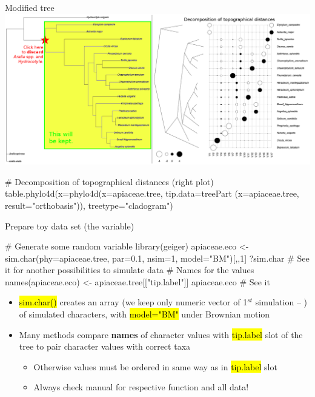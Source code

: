 \documentclass[compress, ucs, xelatex, 11pt, xcolor=svgnames,
  hyperref={
    bookmarks=true,
    unicode=true,
    colorlinks=true,
    pdftitle={Molecular data in R},
    plainpages=false,
    pdfauthor={Vojtech Zeisek},
    pdfsubject={Course about phylogeny and evolution in R},
    pdfcreator={XeLaTeX},
    pdfkeywords={R, evolution, phylogeny, molecular data},
    linkcolor=Tomato,
    anchorcolor=SaddleBrown,
    citecolor=Goldenrod,
    filecolor=DarkMagenta,
    menucolor=Sienna,
    urlcolor=DarkTurquoise,
    pdftex},
  url={hyphens, lowtilde} %
  ]{beamer}
\renewcommand{\texttt}[1]{\hl{\ttfamily #1}}
\begin{document}
\begin{frame}[fragile]{Modified tree}
  \includegraphics[width=\textwidth]{apiaceae_tree.png}
  \begin{spluscode}
    # Decomposition of topographical distances (right plot)
    table.phylo4d(x=phylo4d(x=apiaceae.tree, tip.data=treePart
      (x=apiaceae.tree, result="orthobasis")), treetype="cladogram")
  \end{spluscode}
\end{frame}

\begin{frame}[fragile]{Prepare toy data set (the variable)}
  \begin{spluscode}
    # Generate some random variable
    library(geiger)
    apiaceae.eco <- sim.char(phy=apiaceae.tree, par=0.1, nsim=1,
      model="BM")[,,1]
    ?sim.char # See it for another possibilities to simulate data
    # Names for the values
    names(apiaceae.eco) <- apiaceae.tree[["tip.label"]]
    apiaceae.eco # See it
  \end{spluscode}
  \begin{itemize}
    \item \texttt{sim.char()} creates an array (we keep only numeric vector of 1$^{st}$ simulation -- \texttt{[,,1]}) of simulated characters, with \texttt{model="BM"} under Brownian motion
    \item Many methods compare \textbf{names} of character values with \texttt{tip.label} slot of the tree to pair character values with correct taxa
    \begin{itemize}
      \item Otherwise values must be ordered in same way as in \texttt{tip.label} slot
      \item \alert{Always check manual for respective function and all data!}
    \end{itemize}
  \end{itemize}
\end{frame}
\end{document}
